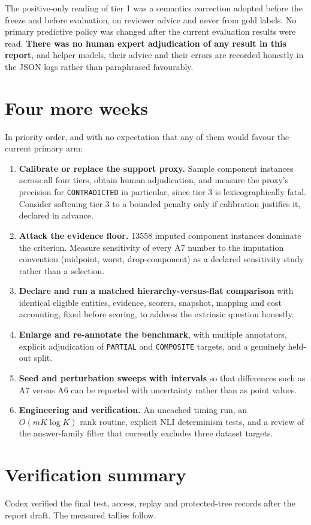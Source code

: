 \documentclass[11pt,a4paper]{article}
\begin{document}
The positive-only reading of tier 1 was a semantics correction adopted before the freeze and before evaluation, on reviewer advice and never from gold labels. No primary predictive policy was changed after the current evaluation results were read. \textbf{There was no human expert adjudication of any result in this report}, and helper models, their advice and their errors are recorded honestly in the JSON logs rather than paraphrased favourably.

\section{Four more weeks}

In priority order, and with no expectation that any of them would favour the current primary arm:

\begin{enumerate}
\item \textbf{Calibrate or replace the support proxy.} Sample component instances across all four tiers, obtain human adjudication, and measure the proxy's precision for \texttt{CONTRADICTED} in particular, since tier 3 is lexicographically fatal. Consider softening tier 3 to a bounded penalty only if calibration justifies it, declared in advance.
\item \textbf{Attack the evidence floor.} 13558 imputed component instances dominate the criterion. Measure sensitivity of every A7 number to the imputation convention (midpoint, worst, drop-component) as a declared sensitivity study rather than a selection.
\item \textbf{Declare and run a matched hierarchy-versus-flat comparison} with identical eligible entities, evidence, scorers, snapshot, mapping and cost accounting, fixed before scoring, to address the extrinsic question honestly.
\item \textbf{Enlarge and re-annotate the benchmark}, with multiple annotators, explicit adjudication of \texttt{PARTIAL} and \texttt{COMPOSITE} targets, and a genuinely held-out split.
\item \textbf{Seed and perturbation sweeps with intervals} so that differences such as A7 versus A6 can be reported with uncertainty rather than as point values.
\item \textbf{Engineering and verification.} An uncached timing run, an $O(mK\log K)$ rank routine, explicit NLI determinism tests, and a review of the answer-family filter that currently excludes three dataset targets.
\end{enumerate}

\section{Verification summary}

Codex verified the final test, access, replay and protected-tree records after the report draft. The measured tallies follow.

\end{document}
